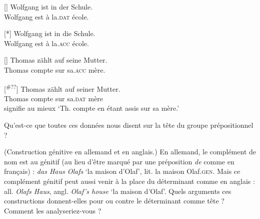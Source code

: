 {    \begin{exe}
    []{
    \gll   Wolfgang ist in der Schule.\\
    Wolfgang est à la.\textsc{dat} école.\\}

    [*]{
    \gll   Wolfgang ist in die Schule. \\
    Wolfgang est à la.\textsc{acc} école.\\}

    []{
    \gll Thomas zählt auf seine Mutter.\\
    Thomas compte sur sa.\textsc{acc} mère.\\}

    [\textsuperscript{\#??}]{
    \gll Thomas zählt auf seiner Mutter.\\
    Thomas compte sur sa.\textsc{dat} mère \\
    \glt    signifie au mieux ‘Th. compte en étant assis sur sa mère.’}
    \end{exe}

    \noindent Qu’est-ce que toutes ces données nous disent sur la tête du groupe prépositionnel ?

     ({Construction génitive en allemand et en anglais.}) En allemand, le complément de nom est au génitif (au lieu d’être marqué par une préposition \textit{de} comme en français) : \textit{das Haus Olafs} ‘la maison d’Olaf’, lit. la maison Olaf.\textsc{gen}. Mais ce complément génitif peut aussi venir à la place du déterminant comme en anglais : all. \textit{Olafs Haus}, angl. \textit{Olaf’s house} ‘la maison d’Olaf’. Quels arguments ces constructions donnent-elles pour ou contre le déterminant comme tête ? Comment les analyseriez-vous ?
}
